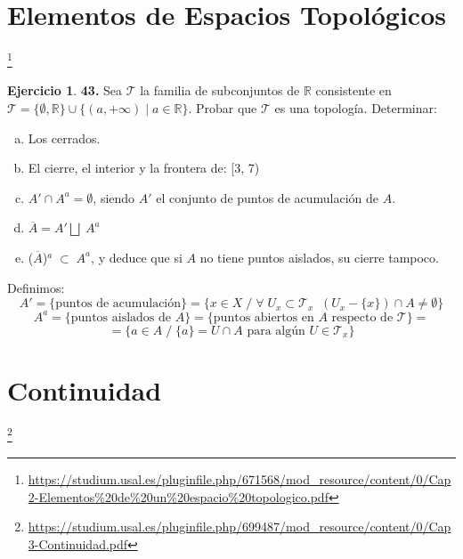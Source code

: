 \documentclass[12pt,twoside]{report}
\newcommand\mc[1]{\mathcal{#1}}
\theoremstyle{azul}
\theoremstyle{azul2}
\theoremstyle{plain}
\theoremstyle{definition}
\newtheorem*{ejern}{Ejercicio}
\theoremstyle{remark}
\begin{document}
\section{Elementos de Espacios Topológicos} \vspace{-15mm} \hfill \footnote{\url{https://studium.usal.es/pluginfile.php/671568/mod_resource/content/0/Cap2-Elementos\%20de\%20un\%20espacio\%20topologico.pdf}}
\begin{ejern} \textbf{43.} Sea $\mc{T}$ la familia de subconjuntos de $\mathbb{R}$ consistente en $\mc{T}=\{\emptyset, \mathbb{R}\} \cup \{ (a,+\infty) \; | \; a \in \mathbb{R} \}$. Probar que $\mc{T}$ es una topología. Determinar:
\vspace{-3mm}
\begin{enumerate}[a)]
    \item Los cerrados.
    \item El cierre, el interior y la frontera de: [3, 7) \; [7, $\infty$) \; \{2\}$\cup$[6, $\infty$) \; \{7, 24, 47, 85\} \; y \; \{3p $|$ p $\in \mathbb{Z}$\}
\end{enumerate}
\end{ejern}

\begin{ejern}
\textbf{45.} \textit{Puntos aislados}. Dado $A \subset X$, se dice que $x \in A$ es un punto aislado de $A$ si $\{x\}$ es un abierto de $A$ con la topología inducida en $A$ como subconjunto de $X$. Se denota por $A^a$ el conjunto de puntos aislados de $A$. Prueba las siguientes igualdades:
\vspace{-3mm}
\begin{enumerate}[a)]
 \item $A' \cap A^a=\emptyset$, siendo $A'$ el conjunto de puntos de acumulación de $A$.
 \item $\overline{A}=A' \bigsqcup \; A^a$
 \item ($\overline{A}$)$^a \; \subset \; A^a$, y deduce que si $A$ no tiene puntos aislados, su cierre tampoco.
\end{enumerate}
Definimos:
$$A'= \{ \text{puntos de acumulación} \} = \{ x \in X \; / \; \forall \; U_x \subset \mc{T}_x \; \; (U_x- \{ x \}) \cap A \neq \emptyset \}$$
$$A^a=\{ \text{puntos aislados de } A  \}= \{ \text{puntos abiertos en } A \text{ respecto de } \mc{T}\}=$$ 
$$=\{ a \in A \; / \; \{a\}=U \cap A \text{ para alg{\'u}n } U \in \mc{T}_x\}$$
\end{ejern}

\section{Continuidad} \vspace{-15mm} \hfill \footnote{\url{https://studium.usal.es/pluginfile.php/699487/mod_resource/content/0/Cap3-Continuidad.pdf}}
\end{document}
